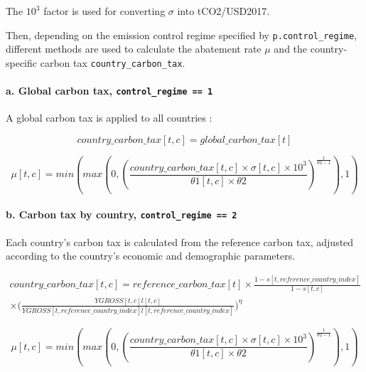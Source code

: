 \documentclass[
]{article}
\begin{document}
The \(10^3\) factor is used for converting \(\sigma\) into tCO2/USD2017.

Then, depending on the emission control regime specified by
\texttt{p.control\_regime}, different methods are used to calculate the
abatement rate \(\mu\) and the country-specific carbon tax
\texttt{country\_carbon\_tax}.

\paragraph{\texorpdfstring{a. Global carbon tax,
\texttt{control\_regime\ ==\ 1}}{a. Global carbon tax, control\_regime == 1}}\label{a.-global-carbon-tax-control_regime-1}

A global carbon tax is applied to all countries :

\begin{equation}
country\_carbon\_tax[t,c] = global\_carbon\_tax[t]
\end{equation}


\begin{equation}
 \mu[t,c] = min \left(max(0, (\frac{country\_carbon\_tax[t,c] \times \sigma[t,c] \times 10^3}{\theta1[t,c] \times \theta2})^{\frac{1}{\theta2 - 1}}), 1 \right) 
\end{equation}


\paragraph{\texorpdfstring{b. Carbon tax by country,
\texttt{control\_regime\ ==\ 2}}{b. Carbon tax by country, control\_regime == 2}}\label{b.-carbon-tax-by-country-control_regime-2}

Each country's carbon tax is calculated from the reference carbon tax,
adjusted according to the country's economic and demographic parameters.

\begin{multline}
country\_carbon\_tax[t,c] = reference\_carbon\_tax[t] \times \frac{1 - s[t,reference\_country\_index]}{1 - s[t,c]} \\
\times \biggl(\frac{YGROSS[t,c]l[t,c]}{YGROSS[t,reference\_country\_index]l[t,reference\_country\_index]}\biggr)^\eta
\end{multline}


\begin{equation}
 \mu[t,c] = min \left(max(0, (\frac{country\_carbon\_tax[t,c] \times \sigma[t,c] \times 10^3}{\theta1[t,c] \times \theta2})^{\frac{1}{\theta2 - 1}}), 1 \right) 
\end{equation}
\end{document}
